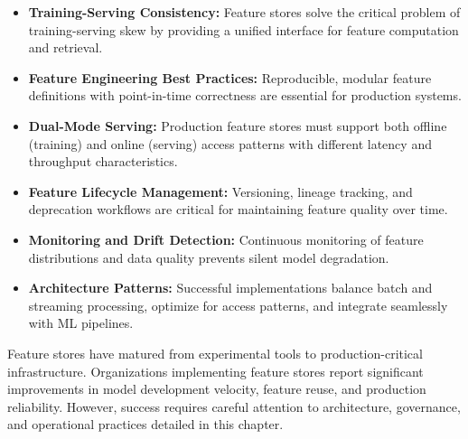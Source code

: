 \begin{itemize}
    \item \textbf{Training-Serving Consistency:} Feature stores solve the critical problem of training-serving skew by providing a unified interface for feature computation and retrieval.

    \item \textbf{Feature Engineering Best Practices:} Reproducible, modular feature definitions with point-in-time correctness are essential for production systems.

    \item \textbf{Dual-Mode Serving:} Production feature stores must support both offline (training) and online (serving) access patterns with different latency and throughput characteristics.

    \item \textbf{Feature Lifecycle Management:} Versioning, lineage tracking, and deprecation workflows are critical for maintaining feature quality over time.

    \item \textbf{Monitoring and Drift Detection:} Continuous monitoring of feature distributions and data quality prevents silent model degradation.

    \item \textbf{Architecture Patterns:} Successful implementations balance batch and streaming processing, optimize for access patterns, and integrate seamlessly with ML pipelines.
\end{itemize}

Feature stores have matured from experimental tools to production-critical infrastructure. Organizations implementing feature stores report significant improvements in model development velocity, feature reuse, and production reliability. However, success requires careful attention to architecture, governance, and operational practices detailed in this chapter.

